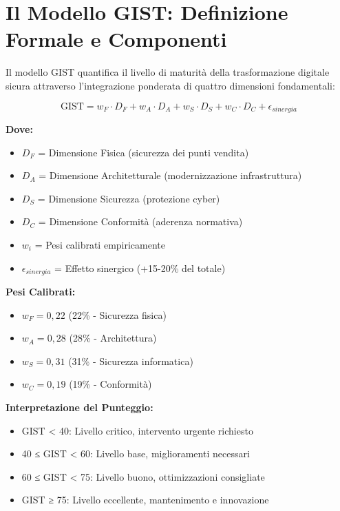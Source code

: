 \section{Il Modello GIST: Definizione Formale e Componenti}
\label{sec:5.3}

\begin{tcolorbox}[
    colback=blue!5!white,
    colframe=blue!75!black,
    title={\textbf{Modello GIST - Global Integrated Security Transformation}},
    fonttitle=\bfseries\large,
    boxrule=1.5pt,
    arc=2mm,
    outer arc=2mm,
    breakable
]

Il modello GIST quantifica il livello di maturità della trasformazione digitale sicura attraverso l'integrazione ponderata di quattro dimensioni fondamentali:

\begin{equation}
\text{GIST} = w_F \cdot D_F + w_A \cdot D_A + w_S \cdot D_S + w_C \cdot D_C + \epsilon_{sinergia}
\label{eq:gist_formula}
\end{equation}

\textbf{Dove:}
\begin{itemize}
    \item $D_F$ = Dimensione Fisica (sicurezza dei punti vendita)
    \item $D_A$ = Dimensione Architetturale (modernizzazione infrastruttura)
    \item $D_S$ = Dimensione Sicurezza (protezione cyber)
    \item $D_C$ = Dimensione Conformità (aderenza normativa)
    \item $w_i$ = Pesi calibrati empiricamente
    \item $\epsilon_{sinergia}$ = Effetto sinergico (+15-20\% del totale)
\end{itemize}

\textbf{Pesi Calibrati:}
\begin{itemize}
    \item $w_F = 0,22$ (22\% - Sicurezza fisica)
    \item $w_A = 0,28$ (28\% - Architettura)
    \item $w_S = 0,31$ (31\% - Sicurezza informatica)
    \item $w_C = 0,19$ (19\% - Conformità)
\end{itemize}

\textbf{Interpretazione del Punteggio:}
\begin{itemize}
    \item GIST < 40: Livello critico, intervento urgente richiesto
    \item 40 ≤ GIST < 60: Livello base, miglioramenti necessari
    \item 60 ≤ GIST < 75: Livello buono, ottimizzazioni consigliate
    \item GIST ≥ 75: Livello eccellente, mantenimento e innovazione
\end{itemize}

\end{tcolorbox}

